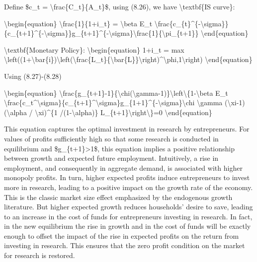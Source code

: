 \documentclass[10pt,math=newtx,citestyle=gb7714-2015,bibstyle=gb7714-2015]{elegantbook}
\begin{document}
	Define \$c\_t = \textbackslash{}frac\{C\_t\}\{A\_t\}\$, using (8.26), we have \textbackslash{}textbf\{IS curve\}:
	
	\textbackslash{}begin\{equation\}
	\textbackslash{}frac\{1\}\{1+i\_t\} = \textbackslash{}beta E\_t \textbackslash{}frac\{c\_\{t\}\^{}\{-\textbackslash{}sigma\}\}\{c\_\{t+1\}\^{}\{-\textbackslash{}sigma\}\}g\_\{t+1\}\^{}\{-\textbackslash{}sigma\}\textbackslash{}frac\{1\}\{\textbackslash{}pi\_\{t+1\}\}
	\textbackslash{}end\{equation\}
	
	\textbackslash{}textbf\{Monetary Policy\}:
	\textbackslash{}begin\{equation\}
	1+i\_t = max \textbackslash{}left((1+\textbackslash{}bar\{i\})\textbackslash{}left(\textbackslash{}frac\{L\_t\}\{\textbackslash{}bar\{L\}\}\textbackslash{}right)\^{}\textbackslash{}phi,1\textbackslash{}right)
	\textbackslash{}end\{equation\}
	
	Using (8.27)-(8.28)
	
	\textbackslash{}begin\{equation\}
	\textbackslash{}frac\{g\_\{t+1\}-1\}\{\textbackslash{}chi(\textbackslash{}gamma-1)\}\textbackslash{}left\textbackslash{}\{1-\textbackslash{}beta E\_t \textbackslash{}frac\{c\_t\^{}\textbackslash{}sigma\}\{c\_\{t+1\}\^{}\textbackslash{}sigma\}g\_\{1+1\}\^{}\{-\textbackslash{}sigma\}\textbackslash{}chi \textbackslash{}gamma (\textbackslash{}xi-1)(\textbackslash{}alpha / \textbackslash{}xi)\^{}\{1 /(1-\textbackslash{}alpha)\} L\_\{t+1\}\textbackslash{}right\textbackslash{}\}=0
	\textbackslash{}end\{equation\}
	
	This equation captures the optimal investment in research by entrepreneurs. For values of profits sufficiently high so that some research is conducted in equilibrium and \$g\_\{t+1\}>1\$, this equation implies a positive relationship between growth and expected future employment. Intuitively, a rise in employment, and consequently in aggregate demand, is associated with higher monopoly profits. In turn, higher expected profits induce entrepreneurs to invest more in research, leading to a positive impact on the growth rate of the economy. This is the classic market size effect emphasized by the endogenous growth literature. But higher expected growth reduces households’ desire to save, leading to an increase in the cost of funds for entrepreneurs investing in research. In fact, in the new equilibrium the rise in growth and in the cost of funds will be exactly enough to offset the impact of the rise in expected profits on the return from investing in research. This ensures that the zero profit condition on the market for research is restored.
	
\end{document}
